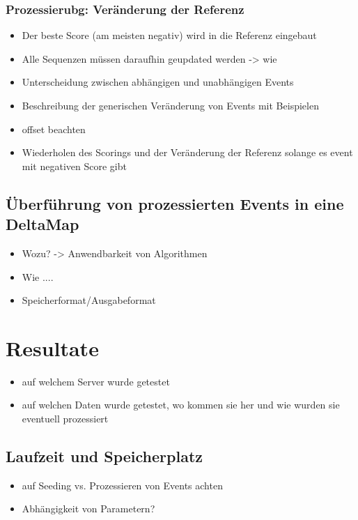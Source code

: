\documentclass[11pt]{article}
\begin{document}
\subsubsection{Prozessierubg: Veränderung der Referenz}
\begin{itemize}
\item Der beste Score (am meisten negativ) wird in die Referenz eingebaut
\item Alle Sequenzen müssen daraufhin geupdated werden -> wie
\item Unterscheidung zwischen abhängigen und unabhängigen Events
\item Beschreibung der generischen Veränderung von Events mit Beispielen
\item offset beachten
\item Wiederholen des Scorings und der Veränderung der Referenz solange es event mit negativen Score gibt
\end{itemize}

\subsection{Überführung von prozessierten Events in eine DeltaMap}
\begin{itemize}
\item Wozu? -> Anwendbarkeit von Algorithmen
\item Wie .... 
\item Speicherformat/Ausgabeformat
\end{itemize}
\pagebreak
\section{Resultate}
\begin{itemize}
\item auf welchem Server wurde getestet
\item auf welchen Daten wurde getestet, wo kommen sie her und wie wurden sie eventuell prozessiert
\end{itemize}

\subsection{Laufzeit und Speicherplatz}
\begin{itemize}
\item auf Seeding vs. Prozessieren von Events achten
\item Abhängigkeit von Parametern?
\end{itemize}
\end{document}
